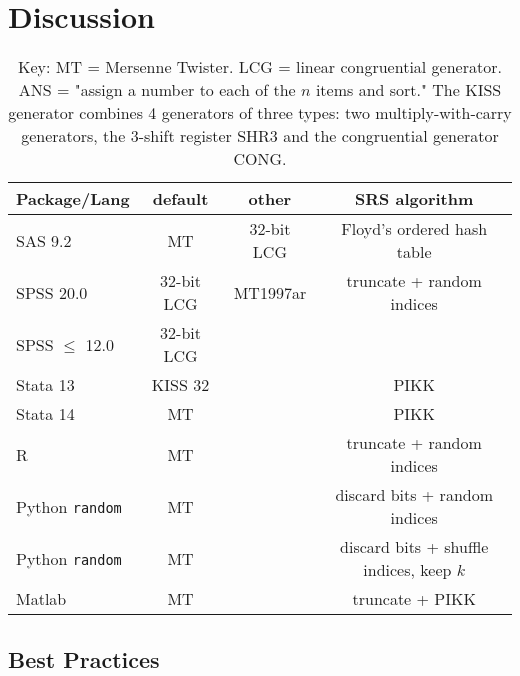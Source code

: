 \documentclass[12pt]{article}
\begin{document}
\section{Discussion}

\begin{table}[h]
\caption{Key: MT = Mersenne Twister. LCG = linear congruential generator. ANS = "assign a number to each of the $n$ items and sort." The KISS generator combines 4 generators of three types: two multiply-with-carry generators, the 3-shift register SHR3 and the congruential generator CONG. }
\begin{center}
\begin{tabular}{l|c|c|c|}
Package/Lang & default & other & SRS algorithm \\
\hline
SAS 9.2 & MT & 32-bit LCG & Floyd's ordered hash table \\ %
SPSS 20.0 & 32-bit LCG & MT1997ar & truncate + random indices \\ %
SPSS $\leq$ 12.0 & 32-bit LCG & & \\
Stata 13 & KISS 32 & & PIKK \\
Stata 14 & MT & & PIKK \\
R & MT & & truncate + random indices \\
Python \texttt{random} & MT & & discard bits + random indices \\
Python \texttt{random} & MT & & discard bits + shuffle indices, keep $k$ \\
Matlab & MT & & truncate + PIKK
\end{tabular}
\end{center}
\label{default}
\end{table}%



\subsection{Best Practices}




\appendix
\end{document}
